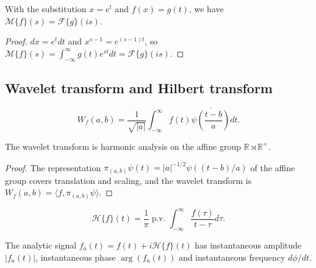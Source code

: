 \begin{proposition}\label{prop:mellin_fourier}
With the substitution $x = e^t$ and $f(x) = g(t)$, we have $\mathcal{M}\{f\}(s) = \mathcal{F}\{g\}(is)$.
\end{proposition}

\begin{proof}
$dx = e^t dt$ and $x^{s-1} = e^{(s-1)t}$, so $\mathcal{M}\{f\}(s) = \int_{-\infty}^{\infty} g(t)e^{st}dt = \mathcal{F}\{g\}(is)$.
\end{proof}

\subsection{\texorpdfstring{Wavelet transform and Hilbert transform}{Wavelet transform and Hilbert transform}}

\begin{definition}\label{def:wavelet_transform}
\[W_f(a,b) = \frac{1}{\sqrt{|a|}} \int_{-\infty}^{\infty} f(t) \overline{\psi\left(\frac{t-b}{a}\right)} dt.\]
\end{definition}

\begin{proposition}\label{prop:wavelet_group}
The wavelet transform is harmonic analysis on the affine group $\mathbb{R} \rtimes \mathbb{R}^+$.
\end{proposition}

\begin{proof}
The representation $\pi_{(a,b)}\psi(t) = |a|^{-1/2}\psi((t-b)/a)$ of the affine group covers translation and scaling, and the wavelet transform is $W_f(a,b) = \langle f, \pi_{(a,b)}\psi \rangle$.
\end{proof}

\begin{definition}\label{def:hilbert}
\[\mathcal{H}\{f\}(t) = \frac{1}{\pi} \operatorname{p.v.} \int_{-\infty}^{\infty} \frac{f(\tau)}{t-\tau} d\tau.\]
\end{definition}

\begin{proposition}\label{prop:analytic_signal}
The analytic signal $f_a(t) = f(t) + i\mathcal{H}\{f\}(t)$ has instantaneous amplitude $|f_a(t)|$, instantaneous phase $\arg(f_a(t))$ and instantaneous frequency $d\phi/dt$.
\end{proposition}


